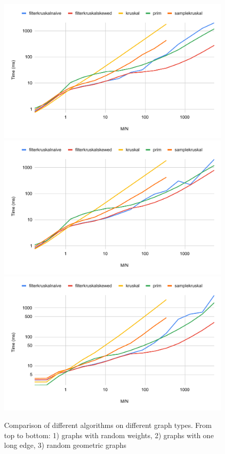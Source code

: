 \documentclass{article}
\begin{document}
\begin{figure}[htp]
    \centering
    \includegraphics[width=.7\linewidth]{images/randgraph.pdf}
    \includegraphics[width=.7\linewidth]{images/hardgraph.pdf}
    \includegraphics[width=.7\linewidth]{images/geomgraph.pdf}
    \caption{Comparison of different algorithms on different graph types. From top to bottom: 1) graphs with random weights, 2) graphs with one long edge, 3) random geometric graphs}
    \label{fig:rand}
\end{figure}
\end{document}
